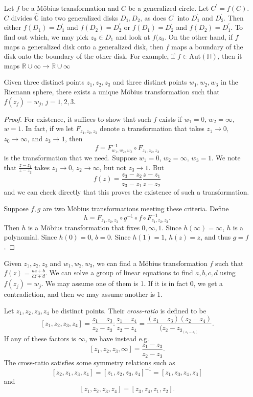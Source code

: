 Let $f$ be a M\"obius transformation and $C$ be a generalized
circle. Let $C^\prime = f(C)$. $C$ divides $\hat{\mathbb{C}}$ into
two generalized disks $D_1, D_2$, as does $C^\prime$ into
$D_1^\prime$ and $D_2^\prime$. Then either
$f(D_1) = D_1^\prime$ and $f(D_2) = D_2^\prime$ or
$f(D_1) = D_2^\prime$ and $f(D_2) = D_1^\prime$. To find out which,
we may pick $z_0 \in D_1$ and look at $f(z_0$. On the other hand,
if $f$ maps a generalized disk onto a generalized disk, then
$f$ maps a boundary of the disk onto the boundary of the other
disk. For example, if $f \in \mathrm{Aut}(\mathbb{H})$, then it maps
$\mathbb{R} \cup {\infty} \to \mathbb{R} \cup {\infty}$

\begin{theorem}
Given three distinct points $z_1, z_2, z_3$ and three distinct points
$w_1, w_2, w_3$ in the Riemann sphere, there exists a unique M\"obius
transformation such that $f(z_j) = w_j$, $j = 1, 2, 3$.
\end{theorem}

\begin{proof}
For existence, it suffices to show that such $f$ exists if $w_1 = 0$,
$w_2 = \infty$, $w = 1$. In fact, if we let $F_{z_1, z_2, z_3}$ denote
a transformation that takes $z_1 \to 0$, $z_0 \to \infty$, and
$z_3 \to 1$, then
$$
f = F_{w_1, w_2, w_3}^{-1} \circ F_{z_1, z_2, z_3}
$$
is the transformation that we need. Suppose $w_1 = 0$,
$w_2 = \infty$, $w_3 = 1$. We note that
$\frac{z - z_1}{z - z_2}$ takes $z_1 \to 0$, $z_2 \to \infty$,
but not $z_3 \to 1$. But
$$
  f(z)
= \frac{z_3 - z_2}
       {z_3 - z_1}
  \frac{z - z_1}
       {z - z_2}
$$
and we can check directly that this proves the existence of
such a transformation.

Suppose $f, g$ are two M\"obius transformations meeting these
criteria. Define
$$
h = F_{z_1,z_2,z_3} \circ g^{-1} \circ f \circ F_{z_1, z_2, z_3}^{-1}.
$$
Then $h$ is a M\"obius transformation that fixes $0, \infty, 1$.
Since $h(\infty) = \infty$, $h$ is a polynomial. Since $h(0) = 0$,
$b = 0$. Since $h(1) = 1$, $h(z) = z$, and thus $g = f$.
\end{proof}

Given $z_1, z_2, z_3$ and $w_1, w_2, w_3$, we can find a M\"obius
transformation $f$ such that $f(z) = \frac{az + b}{cz + d}$.
We can solve a group of linear equations to find $a, b, c, d$
using $f(z_j) = w_j$. We may assume one of them is 1. If it is
in fact 0, we get a contradiction, and then we may assume another
is 1.

\begin{defn}
Let $z_1, z_2, z_3, z_4$ be distinct points. Their \emph{cross-ratio}
is defined to be
$$
  [z_1, z_2, z_3, z_4]
= \frac{z_1 - z_3}{z_2 - z_3}
: \frac{z_1 - z_4}{z_2 - z_4}
= \frac{(z_1 - z_3)(z_2 - z_4)}
       {(z_2 - z_3_(z_1 - z_4)}.
$$
If any of these factors is $\infty$, we have instead e.g.
$$
  [z_1, z_2, z_3, \infty]
= \frac{z_1 - z_3}{z_2 - z_3}.
$$
The cross-ratio satisfies some symmetry relations
such as
$$
  [z_2, z_1, z_3, z_4]
= [z_1, z_2, z_3, z_4]^{-1}
= [z_1, z_3, z_4, z_3]
$$
and
$$
[z_1, z_2, z_3, z_4] = [z_3, z_4, z_1, z_2].
$$
\end{defn}

